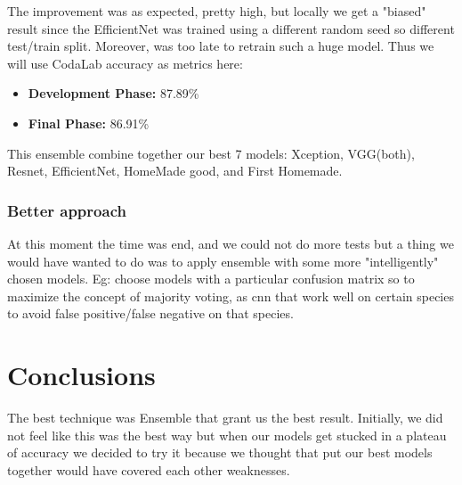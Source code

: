 \documentclass[10pt]{article}
\begin{document}
The improvement was as expected, pretty high, but locally we get a "biased" result since the EfficientNet was trained using a different random seed so different test/train split. Moreover, was too late to retrain such a huge model.
Thus we will use CodaLab accuracy as metrics here:
\begin{itemize}
  \item \textbf{Development Phase:} 87.89\%
  \item \textbf{Final Phase:} 86.91\%
\end{itemize}

This ensemble combine together our best 7 models: Xception, VGG(both), Resnet, EfficientNet, HomeMade good, and First Homemade.

\subsubsection{Better approach}
At this moment the time was end, and we could not do more tests but a thing we would have wanted to do was to apply ensemble with some more "intelligently" chosen models.
Eg: choose models with a particular confusion matrix so to maximize the concept of majority voting, as cnn that work well on certain species to avoid false positive/false negative on that species.

\section{Conclusions}
The best technique was Ensemble that grant us the best result.
Initially, we did not feel like this was the best way but when our models get stucked in a plateau of accuracy
we decided to try it because we thought that put our best models together would have covered each other weaknesses.

\end{document}
